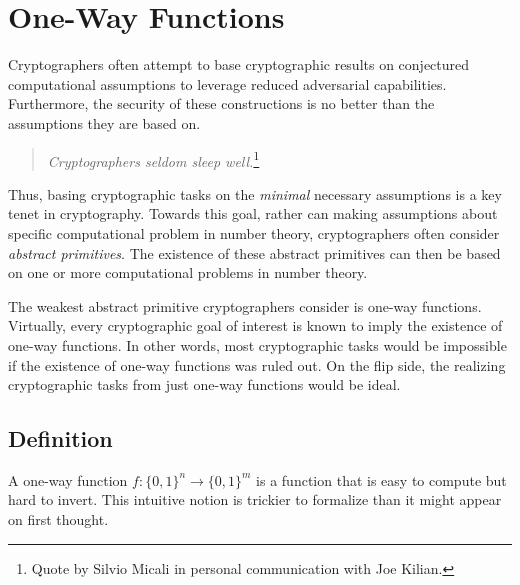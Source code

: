 \newcommand{\binset}[1]{\{0,1\}^{#1}}
\newcommand{\binfunc}[2]{\binset{#1}\rightarrow\binset{#2}}
\newcommand{\bin}{\{0,1\}}
\newcommand{\adv}{\mathcal{A}}
\newcommand{\advb}{\mathcal{B}}
\newcommand{\advc}{\mathcal{C}}

\chapter{One-Way Functions}
\label{sec:owf}

\label{ssec:owf}
Cryptographers often attempt to base cryptographic results on conjectured computational assumptions to leverage reduced adversarial capabilities. Furthermore, the security of these constructions is no better than the assumptions they are based on. 
\begin{quote}
\emph{Cryptographers seldom sleep well.}\footnote{Quote by Silvio Micali in personal communication with Joe Kilian.}
\end{quote}
Thus, basing cryptographic tasks on the \emph{minimal} necessary assumptions is a key tenet in cryptography. Towards this goal, rather can making assumptions about specific computational problem in number theory, cryptographers often consider \emph{abstract primitives}. The existence of these abstract primitives can then be based on one or more computational problems in number theory.

The weakest abstract primitive cryptographers consider is one-way functions. Virtually, every cryptographic goal of interest is known to imply the existence of one-way functions. In other words, most cryptographic tasks would be impossible if the existence of one-way functions was ruled out. On the flip side, the realizing cryptographic tasks from just one-way functions would be ideal. 

\section{Definition}
A one-way function $f: \{0,1\}^n \rightarrow \{0,1\}^m$ is a function that is easy to compute but hard to invert. This intuitive notion is trickier to formalize than it might appear on first thought.


